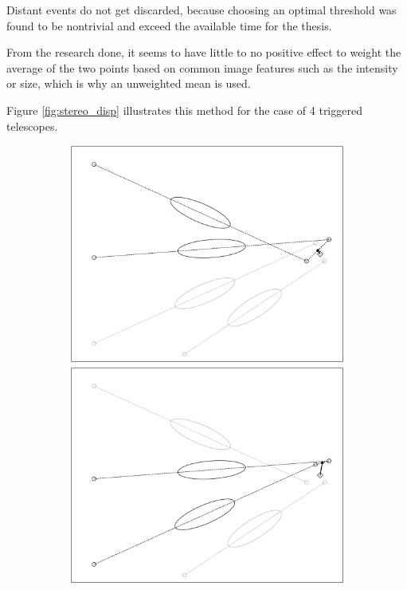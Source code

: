 Distant events do not get discarded, because choosing an optimal threshold 
was found to be nontrivial and exceed the available time for the thesis.

From the research done, it seems to have little to no positive effect to weight
the average of the two points based on common image features such as 
the intensity or size, which is why an unweighted mean is used.

Figure \ref{fig:stereo_disp} illustrates this method for the case of 4 triggered telescopes.

\begin{figure}
    \centering
    \captionsetup{width=0.9\linewidth}
    \begin{subfigure}{0.45\textwidth}
        \includegraphics[width=\linewidth]{Plots/stereo_magic_1.pdf}
        \includegraphics[width=\linewidth]{Plots/stereo_magic_2.pdf}

\end{subfigure}
\end{figure}
